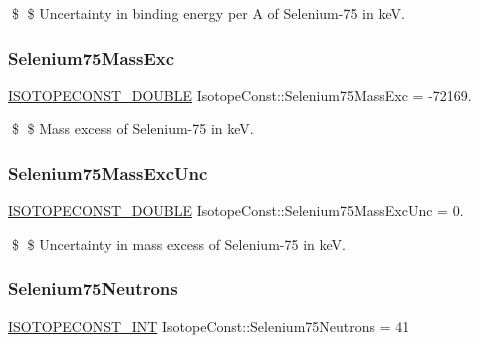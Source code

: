 \$ \$ Uncertainty in binding energy per A of Selenium-\/75 in keV. \mbox{\label{group___isotope_const-_selenium-_se75_gaa159d6e68e0fd989f88696687c50a6dd}} 
\subsubsection{\texorpdfstring{Selenium75\+Mass\+Exc}{Selenium75MassExc}}
{\footnotesize\ttfamily \mbox{\hyperlink{group___isotope_const-_macros_ga8f45a7272ce02c0b4c65c44636ed719a}{I\+S\+O\+T\+O\+P\+E\+C\+O\+N\+S\+T\+\_\+\+D\+O\+U\+B\+LE}} Isotope\+Const\+::\+Selenium75\+Mass\+Exc = -\/72169.}

\$ \$ Mass excess of Selenium-\/75 in keV. \mbox{\label{group___isotope_const-_selenium-_se75_gaae5c81419c04cce0066fba6b1b0fec52}} 
\subsubsection{\texorpdfstring{Selenium75\+Mass\+Exc\+Unc}{Selenium75MassExcUnc}}
{\footnotesize\ttfamily \mbox{\hyperlink{group___isotope_const-_macros_ga8f45a7272ce02c0b4c65c44636ed719a}{I\+S\+O\+T\+O\+P\+E\+C\+O\+N\+S\+T\+\_\+\+D\+O\+U\+B\+LE}} Isotope\+Const\+::\+Selenium75\+Mass\+Exc\+Unc = 0.}

\$ \$ Uncertainty in mass excess of Selenium-\/75 in keV. \mbox{\label{group___isotope_const-_selenium-_se75_gabc52ddd7e44299454b0eb4acbf9bd39d}} 
\subsubsection{\texorpdfstring{Selenium75\+Neutrons}{Selenium75Neutrons}}
{\footnotesize\ttfamily \mbox{\hyperlink{group___isotope_const-_macros_ga5f18360b3e99483a35c32d789e62621c}{I\+S\+O\+T\+O\+P\+E\+C\+O\+N\+S\+T\+\_\+\+I\+NT}} Isotope\+Const\+::\+Selenium75\+Neutrons = 41}


